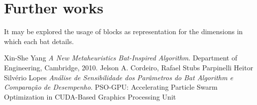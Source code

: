 \documentclass[conference]{IEEEtran}
\begin{document}
\section{Further works}

It may be explored the usage of blocks as representation for the
dimensions in which each bat details.

\begin{thebibliography}{1}

    Xin-She Yang \emph{A New Metaheuristics Bat-Inspired Algorithm}. Department of Engineering, Cambridge, 2010.
    Jelson A. Cordeiro, Rafael Stubs Parpinelli Heitor Silvério Lopes \emph{Análise de Sensibilidade dos Parâmetros do Bat Algorithm e Comparação de Desempenho}.
    PSO-GPU: Accelerating Particle Swarm Optimization in CUDA-Based Graphics Processing Unit
\end{thebibliography}
\end{document}
